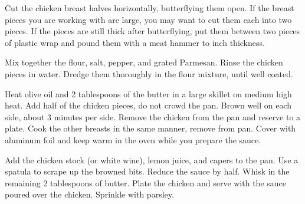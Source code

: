 Cut the chicken breast halves horizontally, butterflying them open. 
If the breast pieces you are working with are large, you may want to cut them each into two pieces. 
If the pieces are still thick after butterflying, put them between two pieces of plastic wrap and 
pound them with a meat hammer to  inch thickness.

Mix together the flour, salt, pepper, and grated Parmesan. Rinse the chicken pieces in water. 
Dredge them thoroughly in the flour mixture, until well coated.

Heat olive oil and 2 tablespoons of the butter in a large skillet on medium high heat. 
Add half of the chicken pieces, do not crowd the pan. Brown well on each side, about 3 minutes per side. 
Remove the chicken from the pan and reserve to a plate. 
Cook the other breasts in the same manner, remove from pan. 
Cover with aluminum foil and keep warm in the oven while you prepare the sauce.

Add the chicken stock (or white wine), lemon juice, and capers to the pan. 
Use a spatula to scrape up the browned bits. Reduce the sauce by half. 
Whisk in the remaining 2 tablespoons of butter. 
Plate the chicken and serve with the sauce poured over the chicken. 
Sprinkle with parsley.